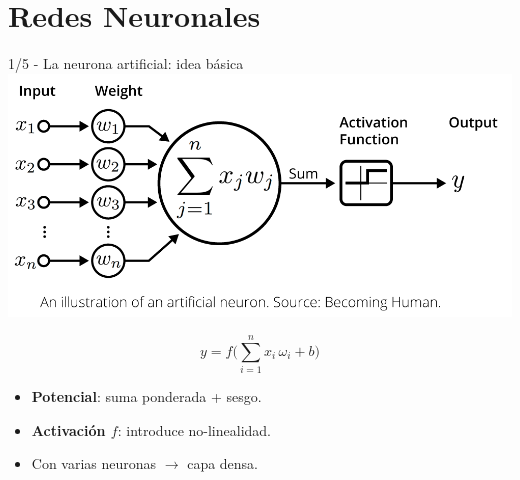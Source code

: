 \documentclass[8pt,spanish]{beamer}
\begin{document}
\section{Redes Neuronales}
\begin{frame}[fragile]{1/5  -  La neurona artificial: idea básica}
  \centering
  \includegraphics[width=.55\textwidth]{neurona.png}

  \[
    y = f\!\Big(\sum_{i=1}^{n} x_i\,\omega_i + b\Big)
  \]

  \begin{itemize}
    \item \textbf{Potencial}: suma ponderada + sesgo.
    \item \textbf{Activación \(f\)}: introduce no-linealidad.
    \item Con varias neuronas \(\rightarrow\) capa densa.
  \end{itemize}
\end{frame}
\end{document}
